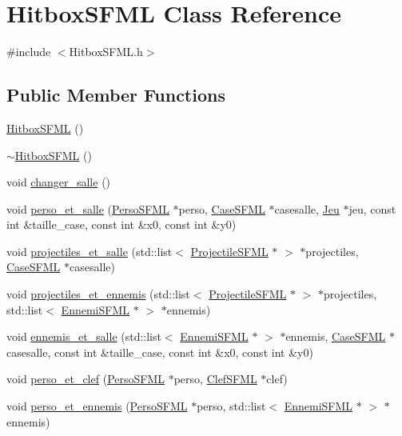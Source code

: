 \hypertarget{classHitboxSFML}{}\section{Hitbox\+S\+F\+ML Class Reference}
\label{classHitboxSFML}


{\ttfamily \#include $<$Hitbox\+S\+F\+M\+L.\+h$>$}

\subsection*{Public Member Functions}
\begin{DoxyCompactItemize}
\item 
\hyperlink{classHitboxSFML_aafccc1508ac80fe745810f2d9f4c10b1}{Hitbox\+S\+F\+ML} ()
\item 
\hyperlink{classHitboxSFML_a7db8de961747c56a000ccd1eb092805d}{$\sim$\+Hitbox\+S\+F\+ML} ()
\item 
void \hyperlink{classHitboxSFML_a8eed6ede26a0f46267570d7e8d96c199}{changer\+\_\+salle} ()
\item 
void \hyperlink{classHitboxSFML_a8ee11312dc168d63978e355af4c56af5}{perso\+\_\+et\+\_\+salle} (\hyperlink{classPersoSFML}{Perso\+S\+F\+ML} $\ast$perso, \hyperlink{classCaseSFML}{Case\+S\+F\+ML} $\ast$casesalle, \hyperlink{classJeu}{Jeu} $\ast$jeu, const int \&taille\+\_\+case, const int \&x0, const int \&y0)
\item 
void \hyperlink{classHitboxSFML_acb3e6f26e67ef2644103500e51909d42}{projectiles\+\_\+et\+\_\+salle} (std\+::list$<$ \hyperlink{classProjectileSFML}{Projectile\+S\+F\+ML} $\ast$ $>$ $\ast$projectiles, \hyperlink{classCaseSFML}{Case\+S\+F\+ML} $\ast$casesalle)
\item 
void \hyperlink{classHitboxSFML_a2fd60880489e78abd5195c17681a1832}{projectiles\+\_\+et\+\_\+ennemis} (std\+::list$<$ \hyperlink{classProjectileSFML}{Projectile\+S\+F\+ML} $\ast$ $>$ $\ast$projectiles, std\+::list$<$ \hyperlink{classEnnemiSFML}{Ennemi\+S\+F\+ML} $\ast$ $>$ $\ast$ennemis)
\item 
void \hyperlink{classHitboxSFML_a74a01b2e9be2b80826e41e9501df9628}{ennemis\+\_\+et\+\_\+salle} (std\+::list$<$ \hyperlink{classEnnemiSFML}{Ennemi\+S\+F\+ML} $\ast$ $>$ $\ast$ennemis, \hyperlink{classCaseSFML}{Case\+S\+F\+ML} $\ast$casesalle, const int \&taille\+\_\+case, const int \&x0, const int \&y0)
\item 
void \hyperlink{classHitboxSFML_a0a220e858ed3936822f7d5dccd0ab0f6}{perso\+\_\+et\+\_\+clef} (\hyperlink{classPersoSFML}{Perso\+S\+F\+ML} $\ast$perso, \hyperlink{classClefSFML}{Clef\+S\+F\+ML} $\ast$clef)
\item 
void \hyperlink{classHitboxSFML_a87f9a5d5e47f2a8551a3087d9fa31272}{perso\+\_\+et\+\_\+ennemis} (\hyperlink{classPersoSFML}{Perso\+S\+F\+ML} $\ast$perso, std\+::list$<$ \hyperlink{classEnnemiSFML}{Ennemi\+S\+F\+ML} $\ast$ $>$ $\ast$ennemis)
\end{DoxyCompactItemize}


